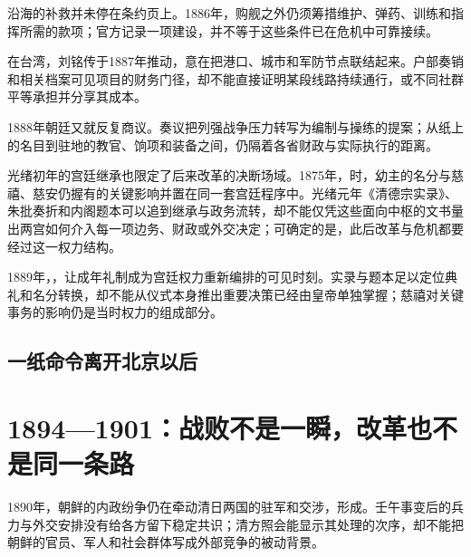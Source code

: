沿海的补救并未停在条约页上。1886年，购舰之外仍须筹措维护、弹药、训练和指挥所需的款项；官方记录一项建设，并不等于这些条件已在危机中可靠接续。

在台湾，刘铭传于1887年推动，意在把港口、城市和军防节点联结起来。户部奏销和相关档案可见项目的财务门径，却不能直接证明某段线路持续通行，或不同社群平等承担并分享其成本。

1888年朝廷又就反复商议。奏议把列强战争压力转写为编制与操练的提案；从纸上的名目到驻地的教官、饷项和装备之间，仍隔着各省财政与实际执行的距离。

光绪初年的宫廷继承也限定了后来改革的决断场域。1875年，时，幼主的名分与慈禧、慈安仍握有的关键影响并置在同一套宫廷程序中。光绪元年《清德宗实录》、朱批奏折和内阁题本可以追到继承与政务流转，却不能仅凭这些面向中枢的文书量出两宫如何介入每一项边务、财政或外交决定；可确定的是，此后改革与危机都要经过这一权力结构。



1889年，，让成年礼制成为宫廷权力重新编排的可见时刻。实录与题本足以定位典礼和名分转换，却不能从仪式本身推出重要决策已经由皇帝单独掌握；慈禧对关键事务的影响仍是当时权力的组成部分。

\subsection{一纸命令离开北京以后}
















\section{1894—1901：战败不是一瞬，改革也不是同一条路}

1890年，朝鲜的内政纷争仍在牵动清日两国的驻军和交涉，形成。壬午事变后的兵力与外交安排没有给各方留下稳定共识；清方照会能显示其处理的次序，却不能把朝鲜的官员、军人和社会群体写成外部竞争的被动背景。


